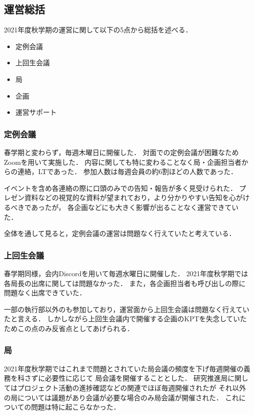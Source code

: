 \subsection*{運営総括}


2021年度秋学期の運営に関して以下の5点から総括を述べる．
\begin{itemize}
    \item 定例会議
    \item 上回生会議
    \item 局
    \item 企画
    \item 運営サポート
\end{itemize}

\subsubsection*{定例会議}
春学期と変わらず，毎週木曜日に開催した．
対面での定例会議が困難なためZoomを用いて実施した．
内容に関しても特に変わることなく局・企画担当者からの連絡，LTであった．
参加人数は毎週会員の約6割ほどの人数であった．

イベントを含め各連絡の際に口頭のみでの告知・報告が多く見受けられた．
プレゼン資料などの視覚的な資料が望まれており，より分かりやすい告知を心がけるべきであったが，
各企画などにも大きく影響が出ることなく運営できていた．

全体を通して見ると，定例会議の運営は問題なく行えていたと考えている．

\subsubsection*{上回生会議}
春学期同様，会内Discordを用いて毎週水曜日に開催した．
2021年度秋学期では各局長の出席に関しては問題なかった．
また，各企画担当者も呼び出しの際に問題なく出席できていた．

一部の執行部以外の\thirdGrade{}も参加しており，運営面から上回生会議は問題なく行えていたと言える．
しかしながら上回生会議内で開催する企画のKPTを失念していたためこの点のみ反省点としてあげられる．

\subsubsection*{局}
2021年度秋学期ではこれまで問題とされていた局会議の頻度を下げ毎週開催の義務を科さずに必要性に応じて
局会議を開催することとした．
研究推進局に関してはプロジェクト活動の進捗確認などの関連でほぼ毎週開催されたが
それ以外の局については議題があり会議が必要な場合のみ局会議が開催された．
これについての問題は特に起こらなかった．


